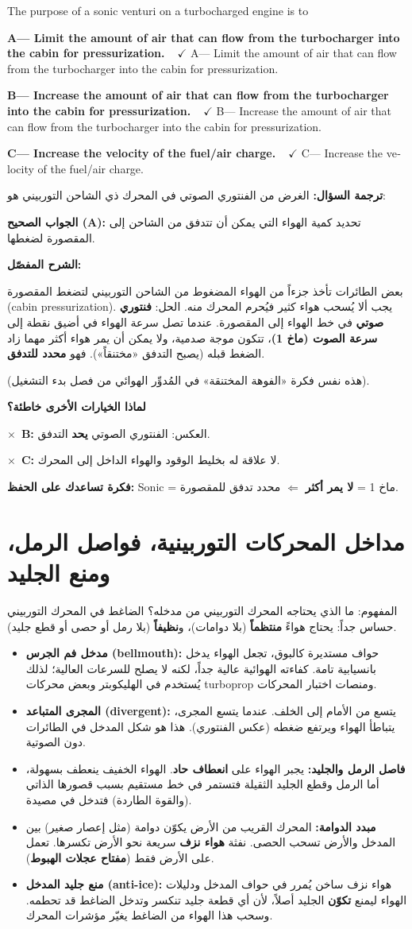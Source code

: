 \documentclass[11pt,a4paper]{article}
\newcommand{\en}[1]{\textenglish{#1}}
\newcommand{\correctletter}{}
\newcommand{\opt}[2]{%
  \ifdefstring{\correctletter}{#1}%
    {\textcolor{ansgreen}{\textbf{#1— #2\ \ $\checkmark$}}}%
    {#1— #2}\par}
\newcommand{\Q}[6]{%
  \renewcommand{\correctletter}{#6}%
  \par\bigskip
  \phantomsection\label{q#1}%
  \begin{tcolorbox}[enhanced,breakable,colback=qback,colframe=qframe,
      arc=2mm,boxrule=0.8pt,fonttitle=\bfseries,
      title={\en{Question #1}}]
    \begin{english}
      #2\par\smallskip
      \opt{A}{#3}\opt{B}{#4}\opt{C}{#5}
    \end{english}
  \end{tcolorbox}}
\newcommand{\tr}[1]{\textbf{\textcolor{qframe}{ترجمة السؤال:}} #1\par}
\newcommand{\ans}[2]{%
  \begin{tcolorbox}[colback=ansback,colframe=ansgreen,boxrule=0.6pt,arc=1.5mm,
      left=4pt,right=4pt,top=2pt,bottom=2pt]
    \textbf{\textcolor{ansgreen}{الجواب الصحيح (\en{#1}):}} #2
  \end{tcolorbox}}
\newcommand{\sharh}[1]{\textbf{\textcolor{conceptc}{الشرح المفصّل:}}\par #1\par}
\newcommand{\nohead}{\textbf{\textcolor{wrongc}{لماذا الخيارات الأخرى خاطئة؟}}\par}
\newcommand{\no}[2]{\hspace*{1em}\textcolor{wrongc}{$\times$}\ \textbf{\en{#1}:} #2\par}
\newcommand{\tip}[1]{%
  \begin{tcolorbox}[colback=tipback,colframe=tipframe,boxrule=0.5pt,arc=1.5mm,
      left=4pt,right=4pt,top=2pt,bottom=2pt]
    \textbf{فكرة تساعدك على الحفظ:} #1
  \end{tcolorbox}}
\begin{document}
\Q{8794}{The purpose of a sonic venturi on a turbocharged engine is to}
{Limit the amount of air that can flow from the turbocharger into the cabin for pressurization.}
{Increase the amount of air that can flow from the turbocharger into the cabin for pressurization.}
{Increase the velocity of the fuel/air charge.}{A}
\tr{الغرض من الفنتوري الصوتي في المحرك ذي الشاحن التوربيني هو:}
\ans{A}{تحديد كمية الهواء التي يمكن أن تتدفق من الشاحن إلى المقصورة لضغطها.}
\sharh{بعض الطائرات تأخذ جزءاً من الهواء المضغوط من الشاحن التوربيني لتضغط المقصورة (\en{cabin pressurization}). يجب ألا يُسحب هواء كثير فيُحرم المحرك منه. الحل: \textbf{فنتوري صوتي} في خط الهواء إلى المقصورة. عندما تصل سرعة الهواء في أضيق نقطة إلى \textbf{سرعة الصوت (ماخ 1)}، تتكون موجة صدمية، ولا يمكن أن يمر هواء أكثر مهما زاد الضغط قبله (يصبح التدفق «مختنقاً»). فهو \textbf{محدد للتدفق}.

(هذه نفس فكرة «الفوهة المختنقة» في المُدوِّر الهوائي من فصل بدء التشغيل).}
\nohead
\no{B}{العكس: الفنتوري الصوتي \textbf{يحد} التدفق.}
\no{C}{لا علاقة له بخليط الوقود والهواء الداخل إلى المحرك.}
\tip{\en{Sonic} = ماخ 1 = \textbf{لا يمر أكثر} $\Leftarrow$ محدد تدفق للمقصورة.}

\newpage
\section{مداخل المحركات التوربينية، فواصل الرمل، ومنع الجليد}

\begin{concept}{المفهوم: ما الذي يحتاجه المحرك التوربيني من مدخله؟}
الضاغط في المحرك التوربيني حساس جداً: يحتاج هواءً \textbf{منتظماً} (بلا دوامات)، و\textbf{نظيفاً} (بلا رمل أو حصى أو قطع جليد).
\begin{itemize}
  \item \textbf{مدخل فم الجرس (\en{bellmouth}):} حواف مستديرة كالبوق، تجعل الهواء يدخل بانسيابية تامة. كفاءته الهوائية عالية جداً، لكنه لا يصلح للسرعات العالية؛ لذلك يُستخدم في الهليكوبتر وبعض محركات \en{turboprop} ومنصات اختبار المحركات.
  \item \textbf{المجرى المتباعد (\en{divergent}):} يتسع من الأمام إلى الخلف. عندما يتسع المجرى، يتباطأ الهواء ويرتفع ضغطه (عكس الفنتوري). هذا هو شكل المدخل في الطائرات دون الصوتية.
  \item \textbf{فاصل الرمل والجليد:} يجبر الهواء على \textbf{انعطاف حاد}. الهواء الخفيف ينعطف بسهولة، أما الرمل وقطع الجليد الثقيلة فتستمر في خط مستقيم بسبب قصورها الذاتي (والقوة الطاردة) فتدخل في مصيدة.
  \item \textbf{مبدد الدوامة:} المحرك القريب من الأرض يكوّن دوامة (مثل إعصار صغير) بين المدخل والأرض تسحب الحصى. نفثة \textbf{هواء نزف} سريعة نحو الأرض تكسرها. تعمل على الأرض فقط (\textbf{مفتاح عجلات الهبوط}).
  \item \textbf{منع جليد المدخل (\en{anti-ice}):} هواء نزف ساخن يُمرر في حواف المدخل ودليلات الهواء ليمنع \textbf{تكوّن} الجليد أصلاً، لأن أي قطعة جليد تنكسر وتدخل الضاغط قد تحطمه. وسحب هذا الهواء من الضاغط يغيّر مؤشرات المحرك.
\end{itemize}
\end{concept}
\end{document}
